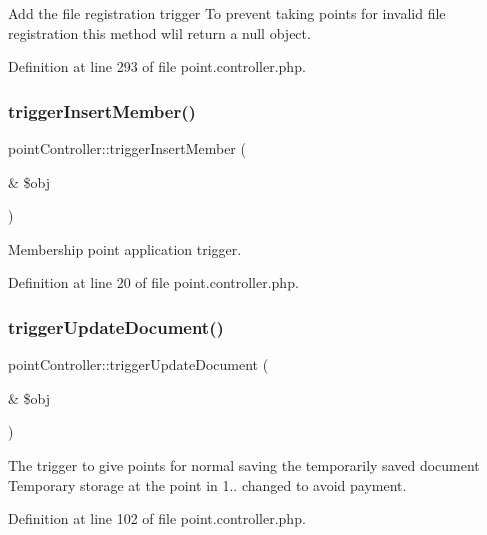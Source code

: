 Add the file registration trigger To prevent taking points for invalid file registration this method wlil return a null object. 



Definition at line 293 of file point.\+controller.\+php.

\hypertarget{classpointController_a98cfacf9f4a7d0d3f5d0d692ba6d8dc3}{}\label{classpointController_a98cfacf9f4a7d0d3f5d0d692ba6d8dc3} 
\subsubsection{\texorpdfstring{trigger\+Insert\+Member()}{triggerInsertMember()}}
{\footnotesize\ttfamily point\+Controller\+::trigger\+Insert\+Member (\begin{DoxyParamCaption}\item[{\&}]{\$obj }\end{DoxyParamCaption})}



Membership point application trigger. 



Definition at line 20 of file point.\+controller.\+php.

\hypertarget{classpointController_a05fba328c369a12065cba849e5c0539c}{}\label{classpointController_a05fba328c369a12065cba849e5c0539c} 
\subsubsection{\texorpdfstring{trigger\+Update\+Document()}{triggerUpdateDocument()}}
{\footnotesize\ttfamily point\+Controller\+::trigger\+Update\+Document (\begin{DoxyParamCaption}\item[{\&}]{\$obj }\end{DoxyParamCaption})}



The trigger to give points for normal saving the temporarily saved document Temporary storage at the point in 1.. changed to avoid payment. 



Definition at line 102 of file point.\+controller.\+php.

